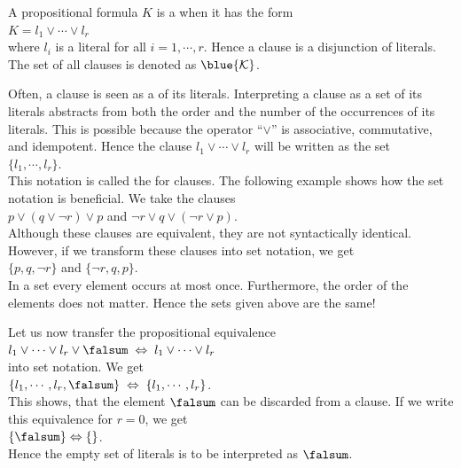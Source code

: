 \begin{Definition}[Clause]
  A propositional formula $K$ is a  when it has the form \\[0.2cm]
  \hspace*{1.3cm} $K = l_1 \vee \cdots \vee l_r$ \\[0.2cm]
  where $l_i$ is a literal for all $i=1,\cdots,r$.  Hence a clause is a disjunction of literals.
  The set of all clauses is denoted as  $\blue{\mathcal{K}}$.
  \eox
\end{Definition}

Often, a clause is seen as a  of its literals.  Interpreting a clause as a set of its literals
abstracts from both the order and the number of the occurrences of its literals.
This is possible because the operator ``$\vee$'' is associative, commutative, and idempotent.  
Hence the clause  $l_1 \vee \cdots \vee l_r$ will be written as the set
\\[0.2cm]
\hspace*{1.3cm} $\{ l_1, \cdots, l_r \}$.
\\[0.2cm]
This notation is called the  for clauses.  
The following example shows how the set notation is beneficial.  We take the clauses
\\[0.2cm]
\hspace*{1.3cm}
$p \vee (q \vee \neg r) \vee p$ \quad and \quad $\neg r \vee q \vee (\neg r \vee p)$. 
\\[0.2cm]
Although these clauses are equivalent, they are not syntactically identical.  However, if we transform these
clauses into set notation, we get
\\[0.2cm]
\hspace*{1.3cm}
$\{p, q, \neg r \}$ \quad and \quad $\{ \neg r, q, p \}$. 
\\[0.2cm]
In a set every element occurs at most once.  Furthermore, the order of the elements does not matter.
Hence the sets given above are the same!

Let us now transfer the propositional equivalence
\\[0.2cm]
\hspace*{1.3cm}
$l_1 \vee \cdots \vee l_r \vee \falsum \;\Leftrightarrow\; l_1 \vee \cdots \vee l_r$
\\[0.2cm]
into set notation.  We get
\\[0.2cm]
\hspace*{1.3cm}
$\{ l_1, \cdots, l_r, \falsum \} \;\Leftrightarrow\; \{ l_1, \cdots, l_r \}$.
\\[0.2cm]
This shows, that the element $\falsum$ can be discarded from a clause.  If we write this equivalence for $r=0$,
we get
\\[0.2cm]
\hspace*{1.3cm}
$\{\falsum \} \Leftrightarrow \{\}$.
\\[0.2cm]
Hence the empty set of literals is to be interpreted as $\falsum$.

